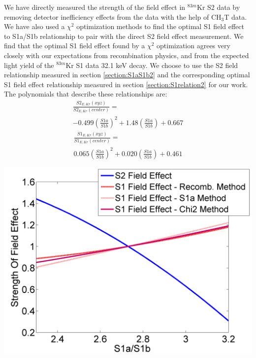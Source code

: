 \documentclass[a4paper,10pt,twocolumn]{article}
\begin{document}
We have directly measured the strength of the field effect in $^{83m}$Kr S2 data by removing detector inefficiency effects from the data with the help of CH$_3$T data.  We have also used a $\chi^2$ optimization methods to find the optimal S1 field effect to S1a/S1b relationship to pair with the direct S2 field effect measurement.  We find that the optimal S1 field effect found by a $\chi^2$ optimization agrees very closely with our expectations from recombination physics, and from the expected light yield of the $^{83m}$Kr S1 data 32.1 keV decay.   We choose to use the S2 field relationship measured in section \ref{section:S1aS1b2} and the corresponding optimal S1 field effect relationship measured in section \ref{section:S1relation2} for our work.  The polynomials that describe these relationships are:
\begin{multline}
\frac{S2_{E,Kr}(xyz)}{S2_{E,Kr}(center)} =   \\ -0.499 \left(\frac{S1a}{S1b} \right)^2 + 1.48  \left(\frac{S1a}{S1b} \right) + 0.667
\end{multline}
\begin{multline}
\frac{S1_{E,Kr}(xyz)}{S1_{E,Kr}(center)} = \\  0.065 \left(\frac{S1a}{S1b} \right)^2 + 0.020 \left(\frac{S1a}{S1b} \right) + 0.461
\end{multline}


\begin{center}
\includegraphics[scale=0.4]{Run04Corrections/StrengthOfFieldEffectOverlay.png}
 \label{AllMeasurements}
\end{center}
\end{document}
